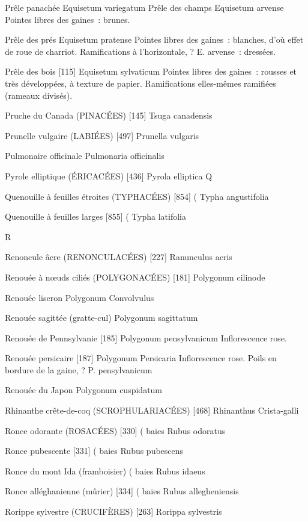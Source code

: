 \documentclass[book,12pt,a4paper,onecolumn,openany]{memoir}
\begin{document}
Prêle panachée
				Equisetum variegatum
Prêle des champs
				Equisetum arvense
Pointes libres des gaines : brunes.

Prêle des prés
				Equisetum pratense
Pointes libres des gaines : blanches, d’où effet de roue de charriot.
Ramifications à l’horizontale, ? E. arvense : dressées.

Prêle des bois  [115]
				Equisetum sylvaticum
Pointes libres des gaines : rousses et très développées, à texture de papier.
Ramifications elles-mêmes ramifiées (rameaux divisés).

Pruche du Canada (PINACÉES)  [145]
				Tsuga canadensis

Prunelle vulgaire (LABIÉES)  [497]
				Prunella vulgaris

Pulmonaire officinale
				Pulmonaria officinalis

Pyrole elliptique (ÉRICACÉES)  [436]
				Pyrola elliptica
Q

Quenouille à feuilles étroites (TYPHACÉES)  [854]		(
				Typha angustifolia

Quenouille à feuilles larges  [855]					(
				Typha latifolia

R

Renoncule âcre (RENONCULACÉES)  [227]
				Ranunculus acris

Renouée à nœuds ciliés (POLYGONACÉES)  [181]
				Polygonum cilinode

Renouée liseron
				Polygonum Convolvulus

Renouée sagittée (gratte-cul)
				Polygonum sagittatum


Renouée de Pennsylvanie  [185]
				Polygonum pensylvanicum
Inflorescence rose.

Renouée persicaire  [187]
				Polygonum Persicaria
Inflorescence rose. Poils en bordure de la gaine, ? P. pensylvanicum

Renouée du Japon
				Polygonum cuspidatum

Rhinanthe crête-de-coq (SCROPHULARIACÉES)  [468]
				Rhinanthus Crista-galli

Ronce odorante (ROSACÉES)  [330]			( baies
				Rubus odoratus

Ronce pubescente  [331]					( baies
				Rubus pubescens

Ronce du mont Ida (framboisier)				( baies
				Rubus idaeus


Ronce alléghanienne (mûrier)  [334]				( baies
				Rubus allegheniensis

Rorippe sylvestre (CRUCIFÈRES)  [263]
				Rorippa sylvestris
\end{document}
